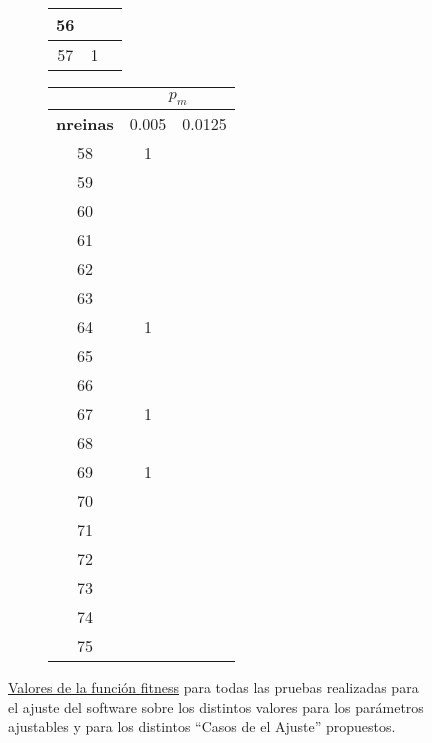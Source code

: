 \begin{figure}[H]
\begin{subfigure}{0.3\textwidth}
\begin{adjustbox}{width=\textwidth}
\begin{tabular}{|c|c|c|}
				56&\cellcolor{green!25}{0}&\cellcolor{green!25}{0}\\ \hline
				57& 1 &\cellcolor{green!25}{0}\\ \hline
			\end{tabular}
		\end{adjustbox}
	\end{subfigure}
	\begin{subfigure}{0.3\textwidth}
		\begin{adjustbox}{width=\textwidth} 
			\begin{tabular}{|c|c|c|}
				\hline
				\rowcolor{blue!25} & \multicolumn{2}{c|}{\textbf{$p_m$}} \\ \hline
				\rowcolor{blue!25} \textbf{nreinas} & 0.005 & 0.0125 \\ \hline
				58& 1 &\cellcolor{green!25}{0}\\ \hline
				59&\cellcolor{green!25}{0}&\cellcolor{green!25}{0}\\ \hline
				60&\cellcolor{green!25}{0}&\cellcolor{green!25}{0}\\ \hline
				61&\cellcolor{green!25}{0}&\cellcolor{green!25}{0}\\ \hline
				62&\cellcolor{green!25}{0}&\cellcolor{green!25}{0}\\ \hline
				63&\cellcolor{green!25}{0}&\cellcolor{green!25}{0}\\ \hline
				64& 1 &\cellcolor{green!25}{0}\\ \hline
				65&\cellcolor{green!25}{0}&\cellcolor{green!25}{0}\\ \hline
				66&\cellcolor{green!25}{0}&\cellcolor{green!25}{0}\\ \hline
				67& 1 &\cellcolor{green!25}{0}\\ \hline
				68&\cellcolor{green!25}{0}&\cellcolor{green!25}{0}\\ \hline
				69& 1 &\cellcolor{green!25}{0}\\ \hline
				70&\cellcolor{green!25}{0}&\cellcolor{green!25}{0}\\ \hline
				71&\cellcolor{green!25}{0}&\cellcolor{green!25}{0}\\ \hline
				72&\cellcolor{green!25}{0}&\cellcolor{green!25}{0}\\ \hline
				73&\cellcolor{green!25}{0}&\cellcolor{green!25}{0}\\ \hline
				74&\cellcolor{green!25}{0}&\cellcolor{green!25}{0}\\ \hline
				75&\cellcolor{green!25}{0}&\cellcolor{green!25}{0}\\ \hline
			\end{tabular}
		\end{adjustbox}
	\end{subfigure}
	\caption{\underline{Valores de la función fitness} para todas las pruebas realizadas para el ajuste del software sobre los 
	distintos valores para los parámetros ajustables y para los distintos ``Casos de el Ajuste'' propuestos.}
    \label{fig:valores-fitness}
\end{figure}


